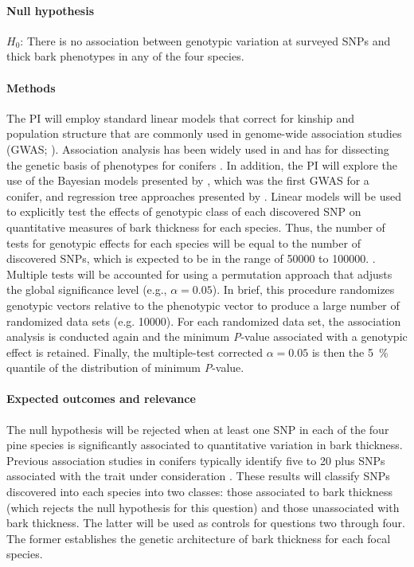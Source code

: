 \paragraph{Null hypothesis} $H_0$: There is no association between genotypic variation at surveyed SNPs and thick bark 
phenotypes in any of the four species.

\paragraph{Methods} The PI will employ standard linear models that correct for kinship and population structure that are 
commonly used in genome-wide association studies (GWAS; \citet{Yu:2006ij}). Association analysis has been widely 
used in and has for dissecting the genetic basis of phenotypes for conifers \citep{Neale:2011jh, Ingvarsson:2011fg}. 
In addition, the PI will explore the use of the Bayesian models presented by \citet{Parchman:2012ca}, which 
was the first GWAS for a conifer, and regression tree approaches presented by \citet{Holliday:2012fz}. 
Linear models will be used to explicitly test the effects of genotypic class of each discovered SNP on quantitative 
measures of bark thickness for each species. Thus, the number of tests for genotypic effects for each species will 
be equal to the number of discovered SNPs, which is expected to be in the range of \num{50000} to \num{100000}. 
\citet{Parchman:2012ca}. Multiple tests will be accounted for using a permutation approach that adjusts the 
global significance level (e.g., $\alpha= 0.05$). In brief, this procedure randomizes genotypic vectors relative to the 
phenotypic vector to produce a large number of randomized data sets (e.g. \num{10000}). For each randomized data 
set, the association analysis is conducted again and the minimum \emph{P}-value associated with a genotypic effect is 
retained. Finally, the multiple-test corrected $\alpha = 0.05$ is then the \SI{5}{\percent} quantile of the distribution of 
minimum \emph{P}-value. 

\paragraph{Expected outcomes and relevance} The null hypothesis will be rejected when at least one SNP in each 
of the four pine species is significantly associated to quantitative variation in bark thickness. Previous association 
studies in conifers typically identify five to 20 plus SNPs associated with the trait under consideration 
\citet{Eckert:2012cw}. These results will classify SNPs discovered into each species into two classes: those 
associated to bark thickness (which rejects the null hypothesis for this question) and those unassociated with 
bark thickness. The latter will be used as controls for questions two through four. The former establishes the 
genetic architecture of bark thickness for each focal species.

